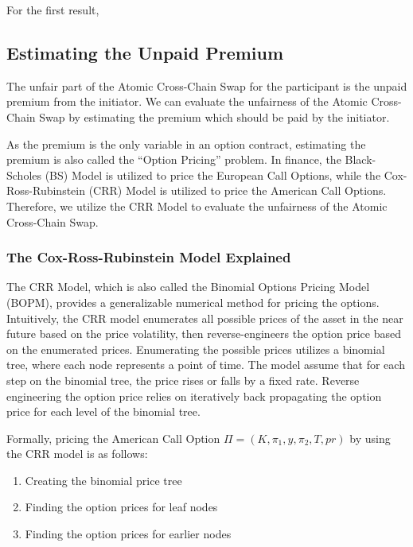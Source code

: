For the first result, %

\subsection{Estimating the Unpaid Premium}

The unfair part of the Atomic Cross-Chain Swap for the participant is the unpaid premium from the initiator.
We can evaluate the unfairness of the Atomic Cross-Chain Swap by estimating the premium which should be paid by the initiator.

As the premium is the only variable in an option contract, estimating the premium is also called the ``Option Pricing'' problem.
In finance, the Black-Scholes (BS) Model is utilized to price the European Call Options,
while the Cox-Ross-Rubinstein (CRR) Model is utilized to price the American Call Options.
Therefore, we utilize the CRR Model to evaluate the unfairness of the Atomic Cross-Chain Swap.

\subsubsection{The Cox-Ross-Rubinstein Model Explained}

The CRR Model, which is also called the Binomial Options Pricing Model (BOPM), provides a generalizable numerical method for pricing the options.
Intuitively, the CRR model enumerates all possible prices of the asset in the near future based on the price volatility,
then reverse-engineers the option price based on the enumerated prices.
Enumerating the possible prices utilizes a binomial tree, where each node represents a point of time.
The model assume that for each step on the binomial tree, the price rises or falls by a fixed rate.
Reverse engineering the option price relies on iteratively back propagating the option price for each level of the binomial tree.

Formally, pricing the American Call Option $\Pi = (K, \pi_1, y, \pi_2, T, pr)$ by using the CRR model is as follows:

\begin{enumerate}
    \item Creating the binomial price tree
    \item Finding the option prices for leaf nodes
    \item Finding the option prices for earlier nodes 
\end{enumerate}

